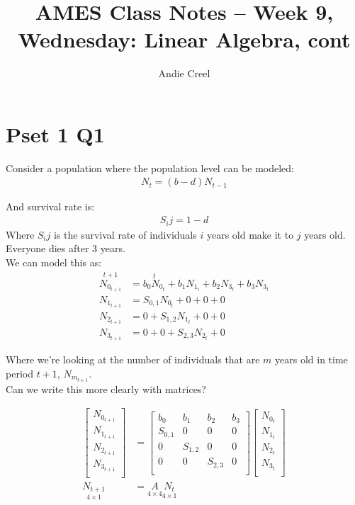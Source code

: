 \documentclass{article}
\title{AMES Class Notes -- Week 9, Wednesday: Linear Algebra, cont}
\author{Andie Creel}
\begin{document}
\maketitle

\section{Pset 1 Q1}
Consider a population where the population level can be modeled: 
\begin{align}
    N_t = (b-d)N_{t-1}
\end{align}

And survival rate is:
\begin{align}
    S_ij = 1 -d
\end{align}
Where $S_ij$ is the survival rate of individuals $i$ years old make it to $j$ years old.\\

Everyone dies after 3 years. \\

We can model this as:
\begin{align}
    \overset{t+1}{N_{0_{t+1}}} &= \overset{t}{b_0 N_{0_t}} + b_1  N_{1_t}+ b_2  N_{3_t} + b_3  N_{3_t}\\
    N_{1_{t+1}} &= S_{0,1} N_{0_t} + 0 + 0 + 0\\
    N_{2_{t+1}} &= 0+ S_{1,2} N_{1_t}+ 0 + 0\\
    N_{3_{t+1}} &= 0 + 0 + S_{2,3} N_{2_t} + 0
\end{align}

Where we're looking at the number of individuals that are $m$ years old in time period $t+1$, $N_{m_{t+1}}$.\\

Can we write this more clearly with matrices?

\begin{align}
    \begin{bmatrix}
        N_{0_{t+1}}\\
        N_{1_{t+1}} \\
        N_{2_{t+1}} \\
        N_{3_{t+1}}\\
    \end{bmatrix} &= 
    \begin{bmatrix}
        b_0 & b_1 & b_2 & b_3\\
        S_{0,1} & 0 & 0 &0 \\
        0 & S_{1,2} & 0 &0 \\
        0 & 0 & S_{2,3} &0 \\
    \end{bmatrix}
    \begin{bmatrix}
        N_{0_{t}}\\
        N_{1_{t}} \\
        N_{2_{t}} \\
        N_{3_{t}}\\
    \end{bmatrix} \\
    \underset{4 \times 1}{N_{t+1}} &= \underset{4 \times 4}{A} \underset{4 \times 1}{N_t}
\end{align}
\end{document}
